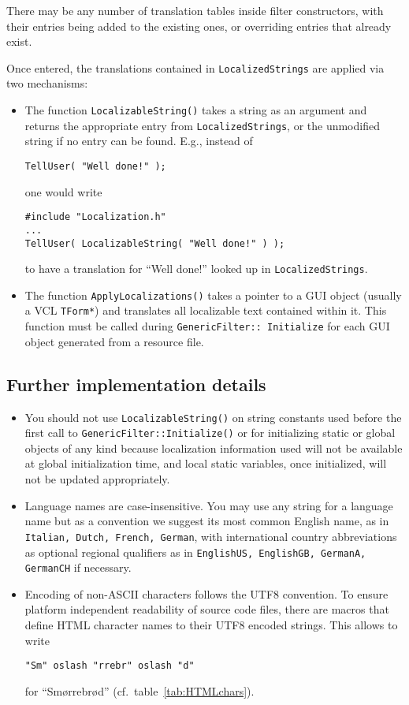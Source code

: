 \documentclass[12pt,letterpaper]{article}
\begin{document}
There may be any number of translation tables inside filter constructors, with their
entries being added to the existing ones, or overriding entries that already exist.

Once entered,
the translations contained in \texttt{LocalizedStrings} are applied via two mechanisms:
\begin{itemize}
\item
The function \texttt{LocalizableString()} takes a string as an argument and returns
the appropriate entry from \texttt{LocalizedStrings}, or the unmodified string if no entry
can be found.
E.g., instead of
\begin{verbatim}
TellUser( "Well done!" );
\end{verbatim}
one would write
\begin{verbatim}
#include "Localization.h"
...
TellUser( LocalizableString( "Well done!" ) );
\end{verbatim}

to have a translation for ``Well done!'' looked up in \texttt{LocalizedStrings}.
\item
The function \texttt{ApplyLocalizations()} takes a pointer to a GUI object (usually
a VCL \texttt{TForm*}) and translates all localizable text contained within it.
This function must be called during \texttt{GenericFilter:: Initialize} for each GUI
object generated from a resource file.
\end{itemize}

\subsection{Further implementation details}
\begin{itemize}
\item
You should not use \texttt{LocalizableString()} on string constants used
before the first call to \texttt{GenericFilter::Initialize()} or for
initializing static or global objects of any kind because localization
information used will not be available at global initialization time, and local static variables, once initialized, will not be updated appropriately.
\item
Language names are case-insensitive. You may use any string for a language name but as a convention we suggest
its most common English name, as in
\texttt{Italian, Dutch, French, German},
with international country abbreviations as optional regional
qualifiers as in
\texttt{EnglishUS, EnglishGB, GermanA, GermanCH}
if necessary.
\item
Encoding of non-ASCII characters follows the UTF8
convention. To ensure platform independent readability of source
code files, there are macros that define HTML character names
to their UTF8 encoded strings. This allows to write

\texttt{"Sm" oslash "rrebr" oslash "d"}

for ``Sm\o{}rrebr\o{}d'' (cf.\ table~\ref{tab:HTMLchars}).

\end{itemize}
\end{document}

